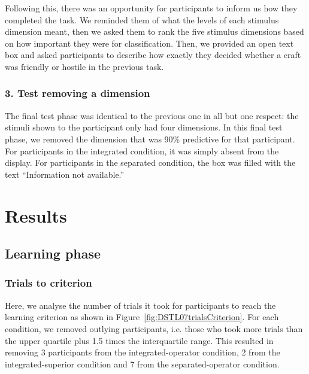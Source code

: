 \documentclass[doc, a4paper, apacite]{apa6}
\begin{document}
Following this, there was an opportunity for participants to inform us how they completed the task. 
We reminded them of what the levels of each stimulus dimension meant, then we asked them to rank the five stimulus dimensions based on how important they were for classification. 
Then, we provided an open text box and asked participants to describe how exactly they decided whether a craft was friendly or hostile in the previous task.

\subsubsection{3. Test removing a dimension}
The final test phase was identical to the previous one in all but one respect: the stimuli shown to the participant only had four dimensions. 
In this final test phase, we removed the dimension that was 90\% predictive for that participant. 
For participants in the integrated condition, it was simply absent from the display. 
For participants in the separated condition, the box was filled with the text ``Information not available.''

\section{Results}

\subsection{Learning phase}
\subsubsection{Trials to criterion}
Here, we analyse the number of trials it took for participants to reach the learning criterion as shown in Figure~\ref{fig:DSTL07trialsCriterion}. 
For each condition, we removed outlying participants, i.e. those who took more trials than the upper quartile plus 1.5 times the interquartile range. 
This resulted in removing 3 participants from the integrated-operator condition, 2 from the integrated-superior condition and 7 from the separated-operator condition. 
\end{document}
